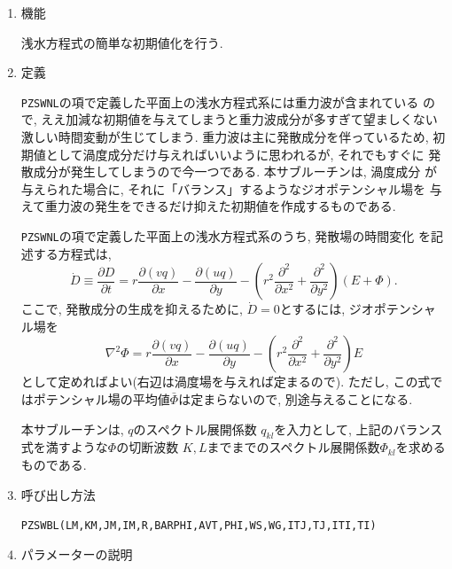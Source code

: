 \documentclass[a4j,fleqn]{jarticle}
\begin{document}
\begin{enumerate}

\item 機能 

浅水方程式の簡単な初期値化を行う.

\item 定義

{\tt PZSWNL}の項で定義した平面上の浅水方程式系には重力波が含まれている
ので, ええ加減な初期値を与えてしまうと重力波成分が多すぎて望ましくない
激しい時間変動が生じてしまう. 重力波は主に発散成分を伴っているため,
初期値として渦度成分だけ与えればいいように思われるが, それでもすぐに
発散成分が発生してしまうので今一つである. 本サブルーチンは, 渦度成分
が与えられた場合に, それに「バランス」するようなジオポテンシャル場を
与えて重力波の発生をできるだけ抑えた初期値を作成するものである.

{\tt PZSWNL}の項で定義した平面上の浅水方程式系のうち, 発散場の時間変化
を記述する方程式は,
\begin{equation}
\dot{D}\equiv\frac{\partial D}{\partial t}
=r\frac{\partial(vq)}{\partial x}
-\frac{\partial(uq)}{\partial y}
 -\left(r^2\frac{\partial^2}{\partial x^2}
  +\frac{\partial^2}{\partial y^2}\right)(E+\Phi).
\end{equation}
ここで, 発散成分の生成を抑えるために, $\dot D=0$とするには, 
ジオポテンシャル場を
\begin{equation}
\nabla^2\Phi
=r\frac{\partial(vq)}{\partial x}
-\frac{\partial(uq)}{\partial y}
 -\left(r^2\frac{\partial^2}{\partial x^2}
  +\frac{\partial^2}{\partial y^2}\right) E
\end{equation}
として定めればよい(右辺は渦度場を与えれば定まるので).
ただし, この式ではポテンシャル場の平均値$\bar\Phi$は定まらないので,
別途与えることになる.

本サブルーチンは, $q$のスペクトル展開係数
$q_{kl}$を入力として, 上記のバランス式を満すような$\Phi$の切断波数
$K,L$までまでのスペクトル展開係数$\Phi_{kl}$を求めるものである.

\item 呼び出し方法 

{\tt PZSWBL(LM,KM,JM,IM,R,BARPHI,AVT,PHI,WS,WG,ITJ,TJ,ITI,TI)}
  
\item パラメーターの説明


\end{enumerate}
\end{document}
